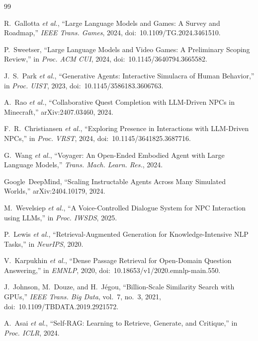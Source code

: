 \documentclass[conference]{IEEEtran}
\begin{document}
\begin{thebibliography}{99}

R.~Gallotta \emph{et al.}, ``Large Language Models and Games: A Survey
and Roadmap,'' \emph{IEEE Trans. Games}, 2024,
doi:~10.1109/TG.2024.3461510.

P.~Sweetser, ``Large Language Models and Video Games: A Preliminary
Scoping Review,'' in \emph{Proc. ACM CUI}, 2024,
doi:~10.1145/3640794.3665582.

J.~S.~Park \emph{et al.}, ``Generative Agents: Interactive Simulacra of
Human Behavior,'' in \emph{Proc. UIST}, 2023,
doi:~10.1145/3586183.3606763.

A.~Rao \emph{et al.}, ``Collaborative Quest Completion with LLM-Driven
NPCs in Minecraft,'' arXiv:2407.03460, 2024.

F.~R.~Christiansen \emph{et al.}, ``Exploring Presence in Interactions
with LLM-Driven NPCs,'' in \emph{Proc. VRST}, 2024,
doi:~10.1145/3641825.3687716.

G.~Wang \emph{et al.}, ``Voyager: An Open-Ended Embodied Agent with Large
Language Models,'' \emph{Trans. Mach. Learn. Res.}, 2024.

Google~DeepMind, ``Scaling Instructable Agents Across Many Simulated
Worlds,'' arXiv:2404.10179, 2024.

M.~Wevelsiep \emph{et al.}, ``A Voice-Controlled Dialogue System for NPC
Interaction using LLMs,'' in \emph{Proc. IWSDS}, 2025.

P.~Lewis \emph{et al.}, ``Retrieval-Augmented Generation for
Knowledge-Intensive NLP Tasks,'' in \emph{NeurIPS}, 2020.

V.~Karpukhin \emph{et al.}, ``Dense Passage Retrieval for Open-Domain
Question Answering,'' in \emph{EMNLP}, 2020,
doi:~10.18653/v1/2020.emnlp-main.550.

J.~Johnson, M.~Douze, and H.~J\'egou, ``Billion-Scale Similarity Search
with GPUs,'' \emph{IEEE Trans. Big Data}, vol.~7, no.~3, 2021,
doi:~10.1109/TBDATA.2019.2921572.

A.~Asai \emph{et al.}, ``Self-RAG: Learning to Retrieve, Generate, and
Critique,'' in \emph{Proc. ICLR}, 2024.


\end{thebibliography}
\end{document}
